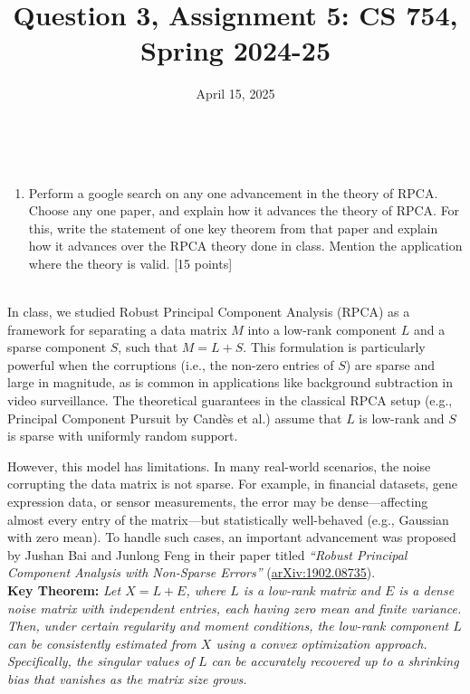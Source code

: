 \documentclass{article}
\title{Question 3, Assignment 5: CS 754, Spring 2024-25}
\author{
\IEEEauthorblockN{
    \begin{tabular}{cccc}
        \begin{minipage}[t]{0.23\textwidth}
            \centering
            Amitesh Shekhar\\
            IIT Bombay\\
            22b0014@iitb.ac.in
        \end{minipage} & 
        \begin{minipage}[t]{0.23\textwidth}
            \centering
            Anupam Rawat\\
            IIT Bombay\\
            22b3982@iitb.ac.in
        \end{minipage} & 
        \begin{minipage}[t]{0.23\textwidth}
            \centering
            Toshan Achintya Golla\\
            IIT Bombay\\
            22b2234@iitb.ac.in
        \end{minipage} \\
        \\ 
    \end{tabular}
}
}
\date{April 15, 2025}
\begin{document}
\maketitle

\\


\begin{enumerate}
\item Perform a google search on any one advancement in the theory of RPCA. Choose any one paper, and explain how it advances the theory of RPCA. For this, write the statement of one key theorem from that paper and explain how it advances over the RPCA theory done in class. Mention the application where the theory is valid. \textsf{[15 points]}
\end{enumerate}
\\
In class, we studied Robust Principal Component Analysis (RPCA) as a framework for separating a data matrix \( M \) into a low-rank component \( L \) and a sparse component \( S \), such that \( M = L + S \). This formulation is particularly powerful when the corruptions (i.e., the non-zero entries of \( S \)) are sparse and large in magnitude, as is common in applications like background subtraction in video surveillance. The theoretical guarantees in the classical RPCA setup (e.g., Principal Component Pursuit by Candès et al.) assume that \( L \) is low-rank and \( S \) is sparse with uniformly random support.

\noindent However, this model has limitations. In many real-world scenarios, the noise corrupting the data matrix is not sparse. For example, in financial datasets, gene expression data, or sensor measurements, the error may be dense—affecting almost every entry of the matrix—but statistically well-behaved (e.g., Gaussian with zero mean). To handle such cases, an important advancement was proposed by Jushan Bai and Junlong Feng in their paper titled \textit{“Robust Principal Component Analysis with Non-Sparse Errors”} (\href{https://arxiv.org/abs/1902.08735}{arXiv:1902.08735}).
\\ 
\noindent \textbf{Key Theorem:} \textit{Let \( X = L + E \), where \( L \) is a low-rank matrix and \( E \) is a dense noise matrix with independent entries, each having zero mean and finite variance. Then, under certain regularity and moment conditions, the low-rank component \( L \) can be consistently estimated from \( X \) using a convex optimization approach. Specifically, the singular values of \( L \) can be accurately recovered up to a shrinking bias that vanishes as the matrix size grows.}
\end{document}

